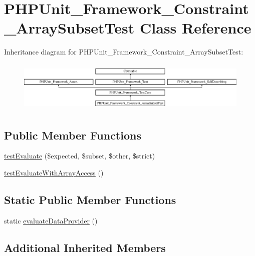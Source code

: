 \hypertarget{class_p_h_p_unit___framework___constraint___array_subset_test}{}\section{P\+H\+P\+Unit\+\_\+\+Framework\+\_\+\+Constraint\+\_\+\+Array\+Subset\+Test Class Reference}
\label{class_p_h_p_unit___framework___constraint___array_subset_test}
Inheritance diagram for P\+H\+P\+Unit\+\_\+\+Framework\+\_\+\+Constraint\+\_\+\+Array\+Subset\+Test\+:\begin{figure}[H]
\begin{center}
\leavevmode
\includegraphics[height=2.480620cm]{class_p_h_p_unit___framework___constraint___array_subset_test}
\end{center}
\end{figure}
\subsection*{Public Member Functions}
\begin{DoxyCompactItemize}
\item 
\mbox{\hyperlink{class_p_h_p_unit___framework___constraint___array_subset_test_ace10c30cb24b94ad84653b3aef4ff7b2}{test\+Evaluate}} (\$expected, \$subset, \$other, \$strict)
\item 
\mbox{\hyperlink{class_p_h_p_unit___framework___constraint___array_subset_test_a9222bc58ccb9d81d296c5bee41cdd2eb}{test\+Evaluate\+With\+Array\+Access}} ()
\end{DoxyCompactItemize}
\subsection*{Static Public Member Functions}
\begin{DoxyCompactItemize}
\item 
static \mbox{\hyperlink{class_p_h_p_unit___framework___constraint___array_subset_test_a56c7d42c68fc43bb9d96e662ada2b5e5}{evaluate\+Data\+Provider}} ()
\end{DoxyCompactItemize}
\subsection*{Additional Inherited Members}


